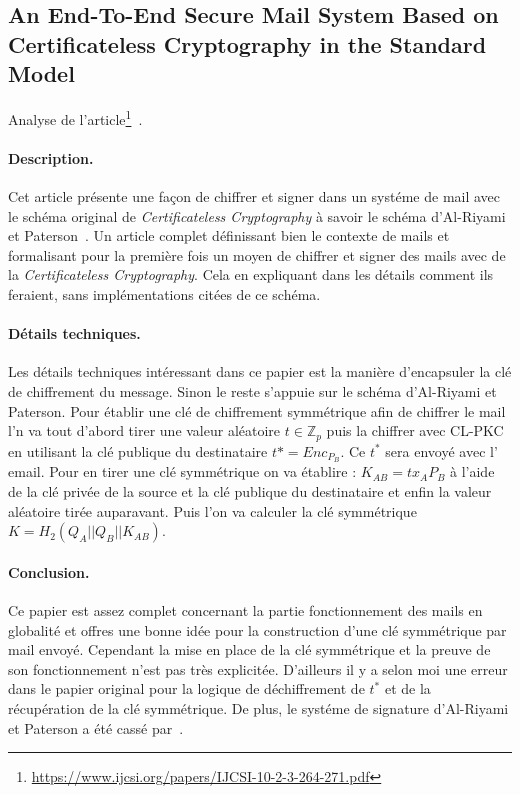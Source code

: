 \subsection{An End-To-End Secure Mail System Based on Certificateless Cryptography in the Standard Model}
Analyse de l'article\footnote{\url{https://www.ijcsi.org/papers/IJCSI-10-2-3-264-271.pdf}}~.
\paragraph*{Description.} Cet article présente une façon de chiffrer et signer dans un systéme de mail avec le schéma original de \textit{Certificateless Cryptography} à savoir le schéma d'Al-Riyami et Paterson~\cite{DBLP:conf/asiacrypt/Al-RiyamiP03}. Un article complet définissant bien le contexte de mails et formalisant pour la première fois un moyen de chiffrer et signer des mails avec de la \textit{Certificateless Cryptography}. Cela en expliquant dans les détails comment ils feraient, sans implémentations citées de ce schéma.
\paragraph*{Détails techniques.} Les détails techniques intéressant dans ce papier est la manière d'encapsuler la clé de chiffrement du message. Sinon le reste s'appuie sur le schéma d'Al-Riyami et Paterson.
Pour établir une clé de chiffrement symmétrique afin de chiffrer le mail l'n va tout d'abord tirer une valeur aléatoire $t \in \mathbb{Z}_p$ puis la chiffrer avec CL-PKC en utilisant la clé publique du destinataire $t* = Enc_{P_B}$. Ce $t^*$ sera envoyé avec l' email. Pour en tirer une clé symmétrique on va établire : $K_{AB} = tx_AP_B$ à l'aide de la clé privée de la source et la clé publique du destinataire et enfin la valeur aléatoire tirée auparavant. Puis l'on va calculer la clé symmétrique $K = H_2(Q_A||Q_B||K_{AB})$.
\paragraph*{Conclusion.} Ce papier est assez complet concernant la partie fonctionnement des mails en globalité et offres une bonne idée pour la construction d'une clé symmétrique par mail envoyé. Cependant la mise en place de la clé symmétrique et la preuve de son fonctionnement n'est pas très explicitée. D'ailleurs il y a selon moi une erreur dans le papier original pour la logique de déchiffrement de $t^*$ et de la récupération de la clé symmétrique. De plus, le systéme de signature d'Al-Riyami et Paterson a été cassé par~\cite{DBLP:conf/cans/HuangSMZ05}.
